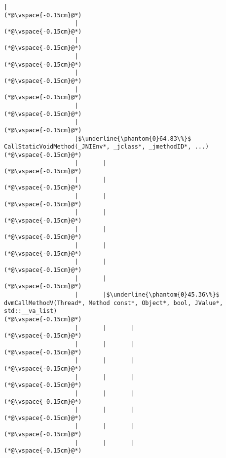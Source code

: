 \begin{lstlisting}[caption=Staattinen metodi C$\to$Java , label=profile:C2JBenchmark00001, numberbychapter=true, frame=lines, float, floatplacement=t]
                    |
(*@\vspace{-0.15cm}@*)
                    |
(*@\vspace{-0.15cm}@*)
                    |
(*@\vspace{-0.15cm}@*)
                    |
(*@\vspace{-0.15cm}@*)
                    |
(*@\vspace{-0.15cm}@*)
                    |
(*@\vspace{-0.15cm}@*)
                    |
(*@\vspace{-0.15cm}@*)
                    |
(*@\vspace{-0.15cm}@*)
                    |$\underline{\phantom{0}64.83\%}$ CallStaticVoidMethod(_JNIEnv*, _jclass*, _jmethodID*, ...)
(*@\vspace{-0.15cm}@*)
                    |       |
(*@\vspace{-0.15cm}@*)
                    |       |
(*@\vspace{-0.15cm}@*)
                    |       |
(*@\vspace{-0.15cm}@*)
                    |       |
(*@\vspace{-0.15cm}@*)
                    |       |
(*@\vspace{-0.15cm}@*)
                    |       |
(*@\vspace{-0.15cm}@*)
                    |       |
(*@\vspace{-0.15cm}@*)
                    |       |
(*@\vspace{-0.15cm}@*)
                    |       |$\underline{\phantom{0}45.36\%}$ dvmCallMethodV(Thread*, Method const*, Object*, bool, JValue*, std::__va_list)
(*@\vspace{-0.15cm}@*)
                    |       |       |
(*@\vspace{-0.15cm}@*)
                    |       |       |
(*@\vspace{-0.15cm}@*)
                    |       |       |
(*@\vspace{-0.15cm}@*)
                    |       |       |
(*@\vspace{-0.15cm}@*)
                    |       |       |
(*@\vspace{-0.15cm}@*)
                    |       |       |
(*@\vspace{-0.15cm}@*)
                    |       |       |
(*@\vspace{-0.15cm}@*)
                    |       |       |
(*@\vspace{-0.15cm}@*)

\end{lstlisting}

